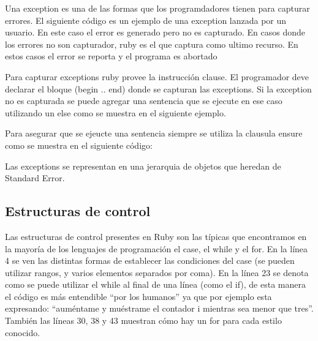 \documentclass{article}
\begin{document}
Una exception es una de las formas que los programdadores tienen para capturar errores. 
El siguiente código es un ejemplo de una exception lanzada por un usuario. En este caso el error es generado pero no es capturado. En casos donde los errores no son capturador, ruby es el que captura como ultimo recurso. En estos casos el error se reporta y el programa es abortado

 
\bigskip

Para capturar exceptions ruby provee la instrucción clause. El programador deve declarar el bloque (begin .. end) donde se capturan las exceptions. Si la exception no es capturada se puede agregar una sentencia que se ejecute en ese caso utilizando un else como se muestra en el siguiente ejemplo. 

 
\bigskip

Para asegurar que se ejeucte una sentencia siempre se utiliza la clausula ensure como se muestra en el siguiente código:

 
\bigskip

Las exceptions se representan en una jerarquia de objetos que heredan de Standard Error. 
\bigskip



\subsection{Estructuras de control}

Las estructuras de control presentes en Ruby son las típicas que encontramos en la mayoría de los lenguajes de programación el case, el while y el for. En la línea 4 se ven las distintas formas de establecer las condiciones del case (se pueden utilizar rangos, y varios elementos separados por coma). En la línea 23 se denota como se puede utilizar el while al final de una línea (como el if), de esta manera el código es más entendible “por los humanos” ya que por ejemplo esta expresando: “auméntame y muéstrame el contador i mientras sea menor que tres”. También las líneas 30, 38 y 43 muestran cómo hay un for para cada estilo conocido.


\bigskip
\end{document}
